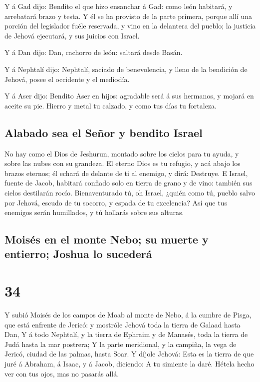  Y á Gad dijo: Bendito el que hizo ensanchar á Gad: como
león habitará, y arrebatará brazo y testa.  Y él se ha
provisto de la parte primera, porque allí una porción del legislador
fuéle reservada, y vino en la delantera del pueblo; la justicia de
Jehová ejecutará, y sus juicios con Israel.

 Y á Dan dijo: Dan, cachorro de león: saltará desde Basán.

 Y á Nephtalí dijo: Nephtalí, saciado de benevolencia, y
lleno de la bendición de Jehová, posee el occidente y el mediodía.

 Y á Aser dijo: Bendito Aser en hijos: agradable será á sus
hermanos, y mojará en aceite su pie.  Hierro y metal tu
calzado, y como tus días tu fortaleza.

\hypertarget{alabado-sea-el-seuxf1or-y-bendito-israel}{%
\subsection{Alabado sea el Señor y bendito
Israel}\label{alabado-sea-el-seuxf1or-y-bendito-israel}}

 No hay como el Dios de Jeshurun, montado sobre los cielos
para tu ayuda, y sobre las nubes con su grandeza.  El
eterno Dios es tu refugio, y acá abajo los brazos eternos; él echará de
delante de ti al enemigo, y dirá: Destruye.  E Israel,
fuente de Jacob, habitará confiado solo en tierra de grano y de vino:
también sus cielos destilarán rocío.  Bienaventurado tú, oh
Israel, ¿quién como tú, pueblo salvo por Jehová, escudo de tu socorro, y
espada de tu excelencia? Así que tus enemigos serán humillados, y tú
hollarás sobre sus alturas.

\hypertarget{moisuxe9s-en-el-monte-nebo-su-muerte-y-entierro-joshua-lo-sucederuxe1}{%
\subsection{Moisés en el monte Nebo; su muerte y entierro; Joshua lo
sucederá}\label{moisuxe9s-en-el-monte-nebo-su-muerte-y-entierro-joshua-lo-sucederuxe1}}

\hypertarget{section-33}{%
\section{34}\label{section-33}}

 Y subió Moisés de los campos de Moab al monte de Nebo, á la
cumbre de Pisga, que está enfrente de Jericó: y mostróle Jehová toda la
tierra de Galaad hasta Dan,  Y á todo Nephtalí, y la tierra
de Ephraim y de Manasés, toda la tierra de Judá hasta la mar postrera;
 Y la parte meridional, y la campiña, la vega de Jericó,
ciudad de las palmas, hasta Soar.  Y díjole Jehová: Esta es
la tierra de que juré á Abraham, á Isaac, y á Jacob, diciendo: A tu
simiente la daré. Hétela hecho ver con tus ojos, mas no pasarás allá.

